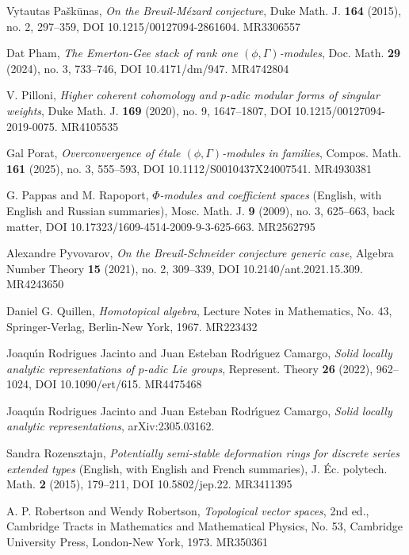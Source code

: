 \item[{[Pa\v{s}15]}] Vytautas Pa\v{s}k\={u}nas, \emph{On the Breuil-M\'ezard conjecture}, Duke Math. J. \textbf{164} (2015), no. 2, 297--359, DOI 10.1215/00127094-2861604. MR3306557
\item[{[Pha24]}] Dat Pham, \emph{The Emerton-Gee stack of rank one $(\phi,\Gamma)$-modules}, Doc. Math. \textbf{29} (2024), no. 3, 733--746, DOI 10.4171/dm/947. MR4742804
\item[{[Pil20]}] V. Pilloni, \emph{Higher coherent cohomology and $p$-adic modular forms of singular weights}, Duke Math. J. \textbf{169} (2020), no. 9, 1647--1807, DOI 10.1215/00127094-2019-0075. MR4105535
\item[{[Por25]}] Gal Porat, \emph{Overconvergence of \'etale $(\phi,\Gamma)$-modules in families}, Compos. Math. \textbf{161} (2025), no. 3, 555--593, DOI 10.1112/S0010437X24007541. MR4930381
\item[{[PR09]}] G. Pappas and M. Rapoport, \emph{$\Phi$-modules and coefficient spaces} (English, with English and Russian summaries), Mosc. Math. J. \textbf{9} (2009), no. 3, 625--663, back matter, DOI 10.17323/1609-4514-2009-9-3-625-663. MR2562795
\item[{[Pyv21]}] Alexandre Pyvovarov, \emph{On the Breuil-Schneider conjecture generic case}, Algebra Number Theory \textbf{15} (2021), no. 2, 309--339, DOI 10.2140/ant.2021.15.309. MR4243650
\item[{[Qui67]}] Daniel G. Quillen, \emph{Homotopical algebra}, Lecture Notes in Mathematics, No. 43, Springer-Verlag, Berlin-New York, 1967. MR223432
\item[{[RJRC22]}] Joaqu\'{\i}n Rodrigues Jacinto and Juan Esteban Rodr\'{\i}guez Camargo, \emph{Solid locally analytic representations of $p$-adic Lie groups}, Represent. Theory \textbf{26} (2022), 962--1024, DOI 10.1090/ert/615. MR4475468
\item[{[RJRC25]}] Joaqu\'{\i}n Rodrigues Jacinto and Juan Esteban Rodr\'{\i}guez Camargo, \emph{Solid locally analytic representations}, arXiv:2305.03162.
\item[{[Roz15]}] Sandra Rozensztajn, \emph{Potentially semi-stable deformation rings for discrete series extended types} (English, with English and French summaries), J. \'Ec. polytech. Math. \textbf{2} (2015), 179--211, DOI 10.5802/jep.22. MR3411395
\item[{[RR73]}] A. P. Robertson and Wendy Robertson, \emph{Topological vector spaces}, 2nd ed., Cambridge Tracts in Mathematics and Mathematical Physics, No. 53, Cambridge University Press, London-New York, 1973. MR350361
